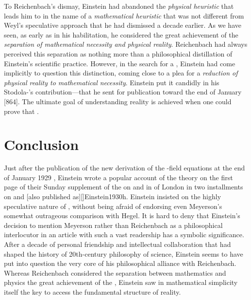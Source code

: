 \documentclass[draft]{article}
\newcommand{\FP}{\german{Fernparallelismus}\xspace}
\begin{document}
To Reichenbach's dismay, Einstein had abandoned the \emph{physical heuristic} that leads him to \gr in the name of a \emph{mathematical heuristic} that was not different from Weyl's speculative approach that he had dismissed a decade earlier. As we have seen, as early as in his habilitation, he considered the great achievement of \rt the \emph{separation of mathematical necessity and physical reality}. Reichenbach had always perceived this separation as nothing more than a philosophical distillation of Einstein's scientific practice. However, in the search for a \uft, Einstein had come implicitly to question this distinction, coming close to a plea for a \emph{reduction of physical reality to mathematical necessity}. Einstein put it candidly in his Stodola-'s contribution---that he sent for publication toward the end of January [864]. The ultimate goal of understanding reality is achieved when one could prove that  \citep[127]{Einstein1929}.

\section{Conclusion}
%
Just after the publication of the new derivation of the \FP-field equations at the end of January 1929 \citep{Einstein1929b}, Einstein wrote a popular account of the theory on the first page of their Sunday supplement of the  on  and in  of London in two installments on  and  [also published as][]{Einstein1930h}. Einstein insisted on the highly speculative nature of \uftp, without being afraid of endorsing even Meyerson's somewhat outrageous comparison with Hegel. It is hard to deny that Einstein's decision to mention Meyerson rather than Reichenbach as a philosophical interlocutor in an article with such a vast readership has a symbolic significance. After a decade of personal friendship and intellectual collaboration that had shaped the history of 20th-century philosophy of science, Einstein seems to have put into question the very core of his philosophical alliance with Reichenbach. Whereas Reichenbach considered the separation between mathematics and physics the great achievement of the \rt, Einstein saw in mathematical simplicity itself the key to access the fundamental structure of reality.
\end{document}
